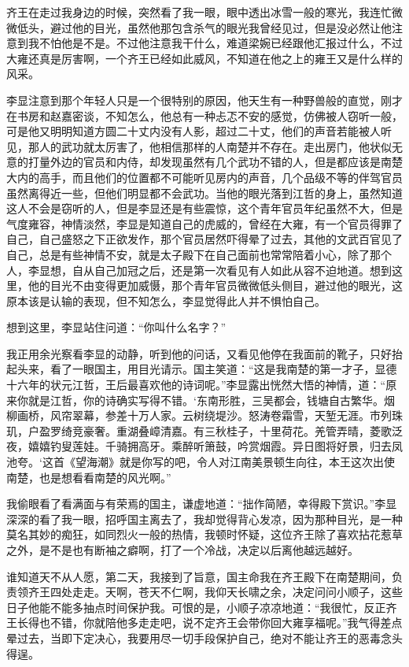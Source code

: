 齐王在走过我身边的时候，突然看了我一眼，眼中透出冰雪一般的寒光，我连忙微微低头，避过他的目光，虽然他那包含杀气的眼光我曾经见过，但是没必然让他注意到我不怕他是不是。不过他注意我干什么，难道梁婉已经跟他汇报过什么，不过大雍还真是厉害啊，一个齐王已经如此威风，不知道在他之上的雍王又是什么样的风采。

李显注意到那个年轻人只是一个很特别的原因，他天生有一种野兽般的直觉，刚才在书房和赵嘉密谈，不知怎么，他总有一种忐忑不安的感觉，仿佛被人窃听一般，可是他又明明知道方圆二十丈内没有人影，超过二十丈，他们的声音若能被人听见，那人的武功就太厉害了，他相信那样的人南楚并不存在。走出房门，他状似无意的打量外边的官员和内侍，却发现虽然有几个武功不错的人，但是都应该是南楚大内的高手，而且他们的位置都不可能听见房内的声音，几个品级不等的伴驾官员虽然离得近一些，但他们明显都不会武功。当他的眼光落到江哲的身上，虽然知道这人不会是窃听的人，但是李显还是有些震惊，这个青年官员年纪虽然不大，但是气度雍容，神情淡然，李显是知道自己的虎威的，曾经在大雍，有一个官员得罪了自己，自己盛怒之下正欲发作，那个官员居然吓得晕了过去，其他的文武百官见了自己，总是有些神情不安，就是太子殿下在自己面前也常常陪着小心，除了那个人，李显想，自从自己加冠之后，还是第一次看见有人如此从容不迫地道。想到这里，他的目光不由变得更加威慑，那个青年官员微微低头侧目，避过他的眼光，这原本该是认输的表现，但不知怎么，李显觉得此人并不惧怕自己。

想到这里，李显站住问道：“你叫什么名字？”

我正用余光察看李显的动静，听到他的问话，又看见他停在我面前的靴子，只好抬起头来，看了一眼国主，用目光请示。国主笑道：“这是我南楚的第一才子，显德十六年的状元江哲，王后最喜欢他的诗词呢。”李显露出恍然大悟的神情，道：“原来你就是江哲，你的诗确实写得不错。‘东南形胜，三吴都会，钱塘自古繁华。烟柳画桥，风帘翠幕，参差十万人家。云树绕堤沙。怒涛卷霜雪，天堑无涯。市列珠玑，户盈罗绮竞豪奢。重湖叠嶂清嘉。有三秋桂子，十里荷花。羌管弄晴，菱歌泛夜，嬉嬉钓叟莲娃。千骑拥高牙。乘醉听箫鼓，吟赏烟霞。异日图将好景，归去凤池夸。‘这首《望海潮》就是你写的吧，令人对江南美景顿生向往，本王这次出使南楚，也是想看看南楚的风光啊。”

我偷眼看了看满面与有荣焉的国主，谦虚地道：“拙作简陋，幸得殿下赏识。”李显深深的看了我一眼，招呼国主离去了，我却觉得背心发凉，因为那种目光，是一种莫名其妙的痴狂，如同烈火一般的热情，我顿时怀疑，这位齐王除了喜欢拈花惹草之外，是不是也有断袖之癖啊，打了一个冷战，决定以后离他越远越好。

谁知道天不从人愿，第二天，我接到了旨意，国主命我在齐王殿下在南楚期间，负责领齐王四处走走。天啊，苍天不仁啊，我仰天长啸之余，决定问问小顺子，这些日子他能不能多抽点时间保护我。可恨的是，小顺子凉凉地道：“我很忙，反正齐王长得也不错，你就陪他多走走吧，说不定齐王会带你回大雍享福呢。”我气得差点晕过去，当即下定决心，我要用尽一切手段保护自己，绝对不能让齐王的恶毒念头得逞。

